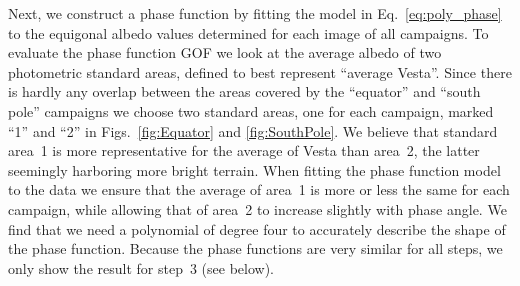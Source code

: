 \documentclass[3p,authoryear]{elsarticle}
\begin{document}
Next, we construct a phase function by fitting the model in Eq.~\ref{eq:poly_phase} to the equigonal albedo values determined for each image of all campaigns. To evaluate the phase function GOF we look at the average albedo of two photometric standard areas, defined to best represent ``average Vesta''. Since there is hardly any overlap between the areas covered by the ``equator'' and ``south pole'' campaigns we choose two standard areas, one for each campaign, marked ``1'' and ``2'' in Figs.~\ref{fig:Equator} and \ref{fig:SouthPole}. We believe that standard area~1 is more representative for the average of Vesta than area~2, the latter seemingly harboring more bright terrain. When fitting the phase function model to the data we ensure that the average of area~1 is more or less the same for each campaign, while allowing that of area~2 to increase slightly with phase angle. We find that we need a polynomial of degree four to accurately describe the shape of the phase function. Because the phase functions are very similar for all steps, we only show the result for step~3 (see below).
\end{document}
